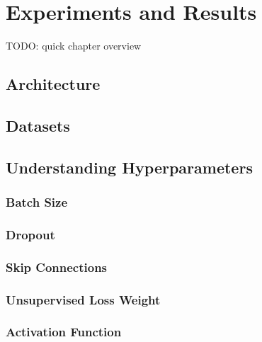 \chapter{Experiments and Results}
\label{chap:ExperimentsAndResults}

TODO: quick chapter overview



\section{Architecture}
\label{sec:Architecture}


\section{Datasets}
\label{sec:Datasets}


\section{Understanding Hyperparameters}
\label{sec:UnderstandingHyperparameters}


\subsection{Batch Size}

\subsection{Dropout}

\subsection{Skip Connections}

\subsection{Unsupervised Loss Weight}

\subsection{Activation Function}

